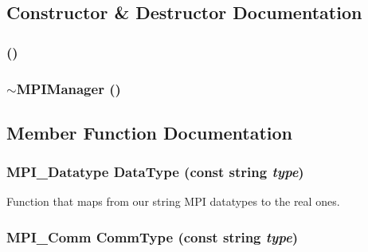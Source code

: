\subsection{Constructor \& Destructor Documentation}
\hypertarget{classJKBuilder_1_1MPIManager_ac5bf36d4313f974db1d1d21362d97d04}{
\subsubsection[{MPIManager}]{ ()}}
\label{classJKBuilder_1_1MPIManager_ac5bf36d4313f974db1d1d21362d97d04}
\hypertarget{classJKBuilder_1_1MPIManager_a8bb26f25399bff1611d0c7db989333d0}{
\subsubsection[{$\sim$MPIManager}]{\setlength{\rightskip}{0pt plus 5cm}$\sim${\bf MPIManager} ()}}
\label{classJKBuilder_1_1MPIManager_a8bb26f25399bff1611d0c7db989333d0}


\subsection{Member Function Documentation}
\hypertarget{classJKBuilder_1_1MPIManager_a10170badfc93237bc6726ea1571da1e2}{
\subsubsection[{DataType}]{\setlength{\rightskip}{0pt plus 5cm}MPI\_\-Datatype DataType (const string {\em type})}}
\label{classJKBuilder_1_1MPIManager_a10170badfc93237bc6726ea1571da1e2}


Function that maps from our string MPI datatypes to the real ones. \hypertarget{classJKBuilder_1_1MPIManager_aa684a7e66e1a5459234d78e7e4c0be6e}{
\subsubsection[{CommType}]{\setlength{\rightskip}{0pt plus 5cm}MPI\_\-Comm CommType (const string {\em type})}}
\label{classJKBuilder_1_1MPIManager_aa684a7e66e1a5459234d78e7e4c0be6e}


